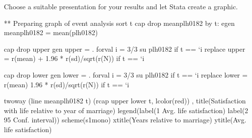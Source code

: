 \documentclass[letterpaper,10pt,openany,onesideH,english]{sphinxmanual}
\begin{document}
\begin{sphinxVerbatim}[commandchars=\\\{\},numbers=left,firstnumber=1,stepnumber=1]
   
   
   
   
   
   

      
\end{sphinxVerbatim}

\begin{figure}[H]
\centering

\noindent{}
\end{figure}

Choose a suitable presentation for your results and let Stata create a graphic.

%
\begin{sphinxVerbatim}[commandchars=\\\{\},numbers=left,firstnumber=1,stepnumber=1]
** Preparing graph of event analysis												
sort t
cap drop meanplh0182
by t: egen meanplh0182 = mean(plh0182)

cap drop upper
gen upper = .
forval i = \PYGZhy{}3/3\PYGZob{} 
	su plh0182 if t == {}`i\PYGZsq{}
	replace upper = r(mean) + 1.96 * r(sd)/sqrt(r(N)) if t == {}`i\PYGZsq{}
\PYGZcb{}

cap drop lower
gen lower = .
forval i = \PYGZhy{}3/3\PYGZob{} 
	su plh0182 if t == {}`i\PYGZsq{}
	replace lower = r(mean) \PYGZhy{} 1.96 * r(sd)/sqrt(r(N)) if t == {}`i\PYGZsq{}
\PYGZcb{}

twoway (line meanplh0182 t) (rcap upper lower t, lcolor(\PYGZdq{}red\PYGZdq{})) , title(\PYGZdq{}Satisfaction with life relative to year of marriage\PYGZdq{}) legend(label(1 \PYGZdq{}Avg. life satisfaction\PYGZdq{}) label(2 \PYGZdq{}95\PYGZpc{} Conf. interval\PYGZdq{})) scheme(s1mono) xtitle(\PYGZdq{}Years relative to marriage\PYGZdq{}) ytitle(\PYGZdq{}Avg. life satisfaction\PYGZdq{})
\end{sphinxVerbatim}
\end{document}
